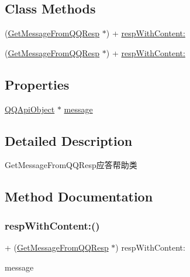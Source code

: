 \subsection*{Class Methods}
\begin{DoxyCompactItemize}
\item 
(\mbox{\hyperlink{interface_get_message_from_q_q_resp}{Get\+Message\+From\+Q\+Q\+Resp}} $\ast$) + \mbox{\hyperlink{interface_get_message_from_q_q_resp_aa51d07fba500424745a3ba7de4e334cc}{resp\+With\+Content\+:}}
\item 
(\mbox{\hyperlink{interface_get_message_from_q_q_resp}{Get\+Message\+From\+Q\+Q\+Resp}} $\ast$) + \mbox{\hyperlink{interface_get_message_from_q_q_resp_aa51d07fba500424745a3ba7de4e334cc}{resp\+With\+Content\+:}}
\end{DoxyCompactItemize}
\subsection*{Properties}
\begin{DoxyCompactItemize}
\item 
\mbox{\hyperlink{interface_q_q_api_object}{Q\+Q\+Api\+Object}} $\ast$ \mbox{\hyperlink{interface_get_message_from_q_q_resp_af0946d12cd159b3e7a8fc8c459f1e01f}{message}}
\end{DoxyCompactItemize}


\subsection{Detailed Description}
Get\+Message\+From\+Q\+Q\+Resp应答帮助类 

\subsection{Method Documentation}
\mbox{\label{interface_get_message_from_q_q_resp_aa51d07fba500424745a3ba7de4e334cc}} 
\subsubsection{\texorpdfstring{resp\+With\+Content\+:()}{respWithContent:()}\hspace{0.1cm}{\footnotesize\ttfamily [1/2]}}
{\footnotesize\ttfamily + (\mbox{\hyperlink{interface_get_message_from_q_q_resp}{Get\+Message\+From\+Q\+Q\+Resp}} $\ast$) resp\+With\+Content\+: \begin{DoxyParamCaption}\item[{(\mbox{\hyperlink{interface_q_q_api_object}{Q\+Q\+Api\+Object}} $\ast$)}]{message }\end{DoxyParamCaption}}

